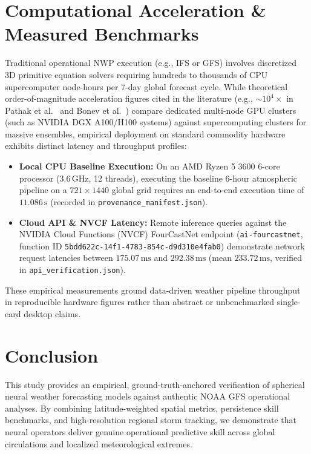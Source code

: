\documentclass[10pt,twocolumn,letterpaper]{article}
\begin{document}
\section{Computational Acceleration \& Measured Benchmarks}
Traditional operational NWP execution (e.g., IFS or GFS) involves discretized 3D primitive equation solvers requiring hundreds to thousands of CPU supercomputer node-hours per 7-day global forecast cycle. While theoretical order-of-magnitude acceleration figures cited in the literature (e.g., $\sim 10^4\times$ in Pathak et al.~\cite{pathak2022fourcastnet} and Bonev et al.~\cite{bonev2023spherical}) compare dedicated multi-node GPU clusters (such as NVIDIA DGX A100/H100 systems) against supercomputing clusters for massive ensembles, empirical deployment on standard commodity hardware exhibits distinct latency and throughput profiles:
\begin{itemize}
    \item \textbf{Local CPU Baseline Execution:} On an AMD Ryzen 5 3600 6-core processor ($3.6\,\text{GHz}$, 12 threads), executing the baseline 6-hour atmospheric pipeline on a $721 \times 1440$ global grid requires an end-to-end execution time of $11.086\,\si{\second}$ (recorded in \texttt{provenance\_manifest.json}).
    \item \textbf{Cloud API \& NVCF Latency:} Remote inference queries against the NVIDIA Cloud Functions (NVCF) FourCastNet endpoint (\texttt{ai-fourcastnet}, function ID \texttt{5bdd622c-14f1-4783-854c-d9d310e4fab0}) demonstrate network request latencies between $175.07\,\si{\milli\second}$ and $292.38\,\si{\milli\second}$ (mean $233.72\,\si{\milli\second}$, verified in \texttt{api\_verification.json}).
\end{itemize}
These empirical measurements ground data-driven weather pipeline throughput in reproducible hardware figures rather than abstract or unbenchmarked single-card desktop claims.

\section{Conclusion}
This study provides an empirical, ground-truth-anchored verification of spherical neural weather forecasting models against authentic NOAA GFS operational analyses. By combining latitude-weighted spatial metrics, persistence skill benchmarks, and high-resolution regional storm tracking, we demonstrate that neural operators deliver genuine operational predictive skill across global circulations and localized meteorological extremes.
\end{document}
